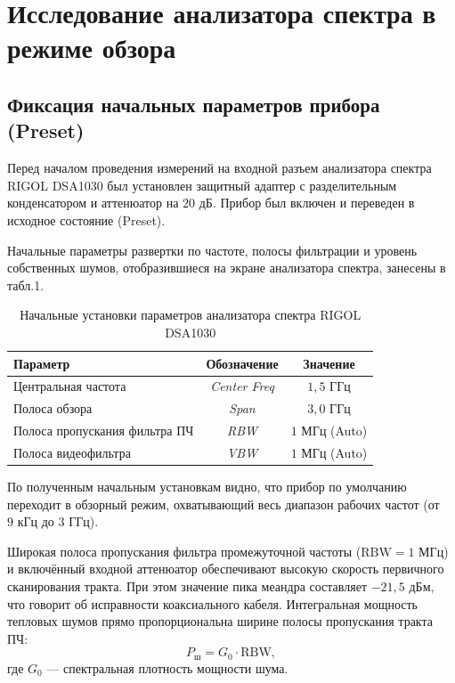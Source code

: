 \section{Исследование анализатора спектра в режиме обзора}
\subsection{Фиксация начальных параметров прибора (Preset)}
Перед началом проведения измерений на входной разъем анализатора спектра RIGOL DSA1030 был установлен защитный адаптер с разделительным конденсатором и аттенюатор на $20\text{ дБ}$. Прибор был включен и переведен в исходное состояние (Preset).

Начальные параметры развертки по частоте, полосы фильтрации и уровень собственных шумов, отобразившиеся на экране анализатора спектра, занесены в табл.1.

\begin{table}[H]
    \caption{Начальные установки параметров анализатора спектра RIGOL DSA1030}
    \label{tab:initial_settings}
    \begin{tabular}{l c c}
        \toprule
        \textbf{Параметр} & \textbf{Обозначение} & \textbf{Значение} \\
        \midrule
        Центральная частота & \textit{Center Freq} & $1{,}5\text{ ГГц}$ \\
        Полоса обзора & \textit{Span} & $3{,}0\text{ ГГц}$ \\
        Полоса пропускания фильтра ПЧ & \textit{RBW} & $1\text{ МГц}$ (Auto) \\
        Полоса видеофильтра & \textit{VBW} & $1\text{ МГц}$ (Auto) \\
        \bottomrule
    \end{tabular}
\end{table}
По полученным начальным установкам видно, что прибор по умолчанию переходит в обзорный режим, охватывающий весь диапазон рабочих частот (от $9\text{ кГц}$ до $3\text{ ГГц}$). 

Широкая полоса пропускания фильтра промежуточной частоты ($\text{RBW} = 1\text{ МГц}$) и включённый входной аттенюатор обеспечивают высокую скорость первичного сканирования тракта. При этом значение пика меандра составляет $-21,5\text{ дБм}$, что говорит об исправности коаксиального кабеля. Интегральная мощность тепловых шумов прямо пропорциональна ширине полосы пропускания тракта ПЧ:
\begin{equation}
    P_{\text{ш}} = G_0 \cdot \text{RBW},
\end{equation}
где $G_0$ --- спектральная плотность мощности шума. 

